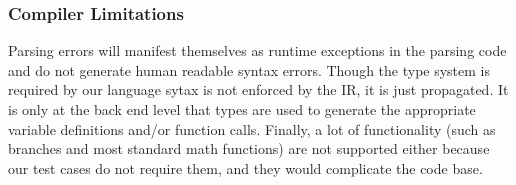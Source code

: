 \subsubsection{Compiler Limitations}

Parsing errors will manifest
  themselves as runtime exceptions in the parsing code and do not
  generate human readable syntax errors.
Though the type system is required by our language sytax 
  is not enforced by the IR, it is just propagated.
It is only at the back end level that types are used to generate the
appropriate   variable definitions and/or function calls.
Finally, a lot of functionality (such as branches and most standard math 
functions) are not supported either because our test cases do not require 
them, and they would complicate the code base.
